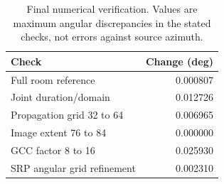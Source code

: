 \begin{table}[t]\centering\small
\caption{Final numerical verification. Values are maximum angular discrepancies in the stated checks, not errors against source azimuth.}
\label{tab:verification}
\begin{tabular}{@{}lr@{}}\toprule
Check & Change (deg)\\\midrule
Full room reference & 0.000807\\
Joint duration/domain & 0.012726\\
Propagation grid 32 to 64 & 0.006965\\
Image extent 76 to 84 & 0.000000\\
GCC factor 8 to 16 & 0.025930\\
SRP angular grid refinement & 0.002310\\
\bottomrule\end{tabular}\end{table}
